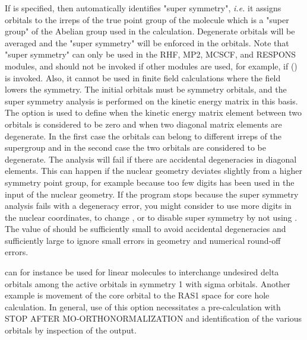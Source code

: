 
If  is specified, then
{\sir} automatically identifies "super symmetry",
{\it i.e.\/} it assigns orbitals to the irreps of the true point
group of the molecule which is a
"super group" of the Abelian group used in the calculation.
Degenerate orbitals will be averaged and the "super symmetry"
will be enforced in the orbitals.
Note that "super symmetry" can only be used
in the RHF, MP2, MCSCF, and RESPONS modules, and should
not be invoked if other modules are used,
for example, if  (\aba) is invoked.
Also, it cannot be used
in finite field calculations where the field lowers the symmetry.
The initial orbitals must be symmetry orbitals, and the super symmetry
analysis is performed on the kinetic energy matrix in this basis.
The  option is used to define when the kinetic
energy matrix element between two orbitals is considered to be
zero and when two diagonal matrix elements are degenerate. In the
first case the orbitals can belong to different irreps of the
supergroup and in the second case the two orbitals are considered
to be degenerate. The analysis will fail if there are accidental
degeneracies in diagonal elements.  This can happen if the nuclear
geometry deviates slightly from a higher symmetry point group, for
example because too few digits has been used in the input of the
nuclear geometry. If the program stops because the super symmetry
analysis fails with a degeneracy error, you might consider to use
more digits in the nuclear coordinates, to change , or
to disable super symmetry by not using .  The value of
 should be sufficiently small to avoid accidental
degeneracies and sufficiently large to ignore small errors in
geometry and numerical round-off errors.


 can for instance be used for
linear molecules to interchange
undesired delta orbitals among the active orbitals in symmetry 1 with
sigma orbitals.  Another example is movement of the core orbital to the
RAS1 space for core hole calculation.  In general, use of this option
necessitates a pre-calculation with STOP AFTER MO-ORTHONORMALIZATION and
identification of the various orbitals by inspection of the output.


